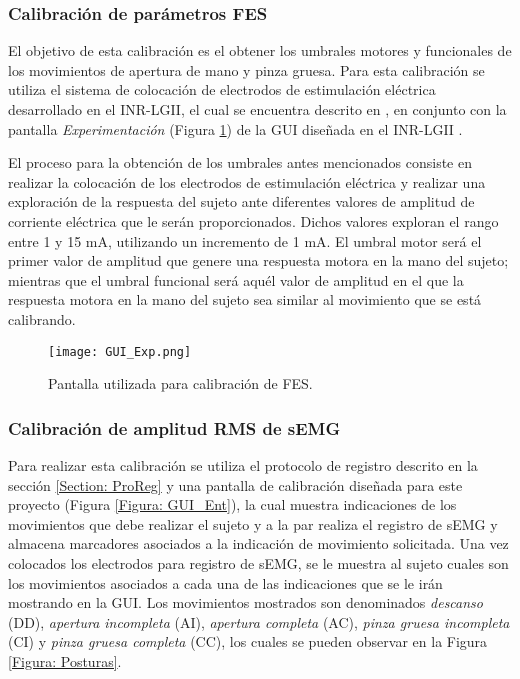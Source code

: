 \subsubsection{Calibración de parámetros FES}
El objetivo de esta calibración es el obtener los umbrales motores y funcionales de los movimientos de apertura de mano y pinza gruesa. Para esta calibración se utiliza el sistema de colocación de electrodos de estimulación eléctrica desarrollado en el INR-LGII, el cual se encuentra descrito en \cite{AnaMartin2019}, en conjunto con la pantalla \emph{Experimentación} (Figura \ref{Figura: GUI_Exp}) de la GUI diseñada en el INR-LGII \cite{JanethFuentes2018}.

El proceso para la obtención de los umbrales antes mencionados consiste en realizar la colocación de los electrodos de estimulación eléctrica y realizar una exploración de la respuesta del sujeto ante diferentes valores de amplitud de corriente eléctrica que le serán proporcionados. Dichos valores exploran el rango entre 1 y 15 mA, utilizando un incremento de 1 mA. El umbral motor será el primer valor de amplitud que genere una respuesta motora en la mano del sujeto; mientras que el umbral funcional será aquél valor de amplitud en el que la respuesta motora en la mano del sujeto sea similar al movimiento que se está calibrando.

\begin{figure}[htb]
	\centering
	\texttt{[image: GUI\_Exp.png]}
	\caption{Pantalla utilizada para calibración de FES.}
	\label{Figura: GUI_Exp}
\end{figure}

\subsubsection{Calibración de amplitud RMS de sEMG}
Para realizar esta calibración se utiliza el protocolo de registro descrito en la sección \ref{Section: ProReg} y una pantalla de calibración diseñada para este proyecto (Figura \ref{Figura: GUI_Ent}), la cual muestra indicaciones de los movimientos que debe realizar el sujeto y a la par realiza el registro de sEMG y almacena marcadores asociados a la indicación de movimiento solicitada. Una vez colocados los electrodos para registro de sEMG, se le muestra al sujeto cuales son los movimientos asociados a cada una de las indicaciones que se le irán mostrando en la GUI. Los movimientos mostrados son denominados \emph{descanso} (DD), \emph{apertura incompleta} (AI), \emph{apertura completa} (AC), \emph{pinza gruesa incompleta} (CI) y \emph{pinza gruesa completa} (CC), los cuales se pueden observar en la Figura \ref{Figura: Posturas}.

